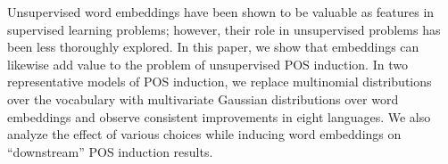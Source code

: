 Unsupervised word embeddings have been shown to be valuable as features in supervised learning problems; however, their role in unsupervised problems has been less thoroughly explored. In this paper, we show that embeddings can likewise add value to the problem of unsupervised POS induction. In two representative models of POS induction, we replace multinomial distributions over the vocabulary with multivariate Gaussian distributions over word embeddings and observe consistent improvements in eight languages. We also analyze the effect of various choices while inducing word embeddings on ``downstream'' POS induction results.
